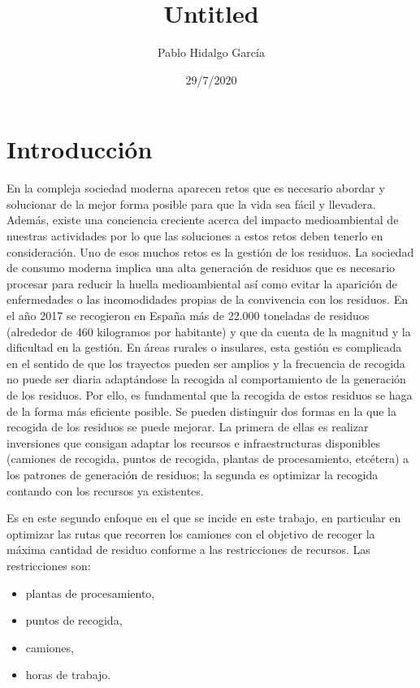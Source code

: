 \documentclass[
]{article}
\title{Untitled}
\author{Pablo Hidalgo García}
\date{29/7/2020}
\providecommand{\tightlist}{%
  \setlength{\itemsep}{0pt}\setlength{\parskip}{0pt}}
\begin{document}
\maketitle

\hypertarget{introducciuxf3n}{%
\section{Introducción}\label{introducciuxf3n}}

En la compleja sociedad moderna aparecen retos que es necesario abordar
y solucionar de la mejor forma posible para que la vida sea fácil y
llevadera. Además, existe una conciencia creciente acerca del impacto
medioambiental de nuestras actividades por lo que las soluciones a estos
retos deben tenerlo en consideración. Uno de esos muchos retos es la
gestión de los residuos. La sociedad de consumo moderna implica una alta
generación de residuos que es necesario procesar para reducir la huella
medioambiental así como evitar la aparición de enfermedades o las
incomodidades propias de la convivencia con los residuos. En el año 2017
se recogieron en España más de 22.000 toneladas de residuos (alrededor
de 460 kilogramos por habitante) y que da cuenta de la magnitud y la
dificultad en la gestión. En áreas rurales o insulares, esta gestión es
complicada en el sentido de que los trayectos pueden ser amplios y la
frecuencia de recogida no puede ser diaria adaptándose la recogida al
comportamiento de la generación de los residuos. Por ello, es
fundamental que la recogida de estos residuos se haga de la forma más
eficiente posible. Se pueden distinguir dos formas en la que la recogida
de los residuos se puede mejorar. La primera de ellas es realizar
inversiones que consigan adaptar los recursos e infraestructuras
disponibles (camiones de recogida, puntos de recogida, plantas de
procesamiento, etcétera) a los patrones de generación de residuos; la
segunda es optimizar la recogida contando con los recursos ya
existentes.

Es en este segundo enfoque en el que se incide en este trabajo, en
particular en optimizar las rutas que recorren los camiones con el
objetivo de recoger la máxima cantidad de residuo conforme a las
restricciones de recursos. Las restricciones son:

\begin{itemize}
\tightlist
\item
  plantas de procesamiento,
\item
  puntos de recogida,
\item
  camiones,
\item
  horas de trabajo.
\end{itemize}
\end{document}
